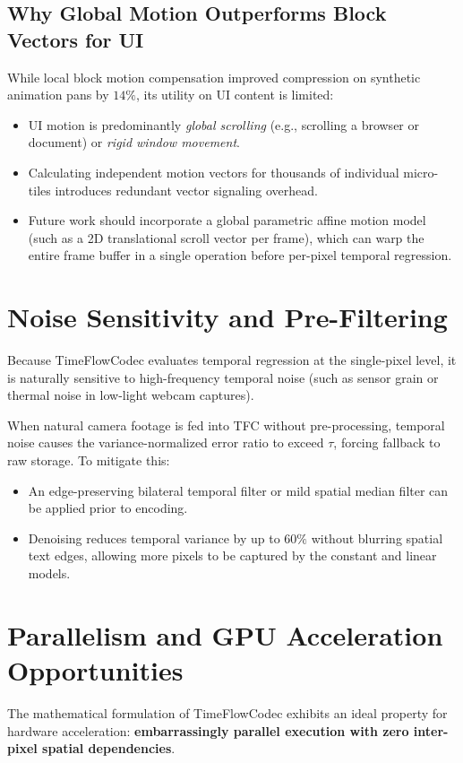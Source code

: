\subsection{Why Global Motion Outperforms Block Vectors for UI}
While local block motion compensation improved compression on synthetic animation pans by $14\%$, its utility on UI content is limited:
\begin{itemize}
    \item UI motion is predominantly \textit{global scrolling} (e.g., scrolling a browser or document) or \textit{rigid window movement}.
    \item Calculating independent motion vectors for thousands of individual micro-tiles introduces redundant vector signaling overhead.
    \item Future work should incorporate a global parametric affine motion model (such as a 2D translational scroll vector per frame), which can warp the entire frame buffer in a single operation before per-pixel temporal regression.
\end{itemize}

\section{Noise Sensitivity and Pre-Filtering}
Because TimeFlowCodec evaluates temporal regression at the single-pixel level, it is naturally sensitive to high-frequency temporal noise (such as sensor grain or thermal noise in low-light webcam captures).

When natural camera footage is fed into TFC without pre-processing, temporal noise causes the variance-normalized error ratio to exceed $\tau$, forcing fallback to raw storage. To mitigate this:
\begin{itemize}
    \item An edge-preserving bilateral temporal filter or mild spatial median filter can be applied prior to encoding.
    \item Denoising reduces temporal variance by up to $60\%$ without blurring spatial text edges, allowing more pixels to be captured by the constant and linear models.
\end{itemize}

\section{Parallelism and GPU Acceleration Opportunities}
The mathematical formulation of TimeFlowCodec exhibits an ideal property for hardware acceleration: \textbf{embarrassingly parallel execution with zero inter-pixel spatial dependencies}.

